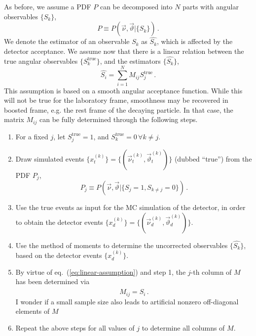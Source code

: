 \documentclass[aps,prd,reprint,nofootinbib,preprintnumbers]{revtex4}
\newcommand{\refeq}[1]{eq.~(\ref{eq:#1})}
\renewcommand{\theta}{\vartheta}
\newcommand{\est}[1]{\widehat{#1}}
\newcommand{\fred}[1]{{\color{brown!85!black}#1}}
\begin{document}
As before, we assume a PDF $P$ can be decomposed into $N$ parts with angular observables $\lbrace S_k\rbrace$,
\begin{equation}
    P \equiv P(\vec\nu,\vec\theta | \lbrace S_k \rbrace)\,.
\end{equation}
We denote the estimator of an
observable $S_k$ as $\est{S_k}$, which is affected by the detector acceptance. We assume now that there is a linear relation
between the true angular observables $\lbrace S_k^\text{true}\rbrace$, and the estimators $\lbrace \est{S_k}\rbrace$,
\begin{equation}
    \label{eq:linear-assumption}
    \est{S_i} = \sum_{i = 1}^N M_{i j} S_j^\text{true}\,.
\end{equation}
This assumption is based on a smooth angular acceptance function. While this will not be true for the laboratory frame,
smoothness may be recovered in boosted frame, e.g. the rest frame of the decaying particle.
In that case, the matrix $M_{ij}$ can be fully determined through the following steps.
\begin{enumerate}
    \item For a fixed $j$, let $S_j^\text{true} = 1$, and $S_k^\text{true} = 0\,\forall k\neq j$.
    \item Draw simulated events $\lbrace x_t^{(k)}\rbrace = \lbrace(\vec{\nu}^{(k)}_t,\vec\theta^{(k)}_t)\rbrace$ (dubbed ``true'') from the PDF $P_j$,
        \begin{equation}
            P_j \equiv P(\vec\nu,\vec\theta | \lbrace S_j = 1, S_{k\neq j} = 0\rbrace)\,.
        \end{equation}
    \item Use the true events as input for the MC simulation of the detector, in order to obtain the detector
        events $\lbrace x^{(k)}_d\rbrace = \lbrace(\vec{\nu}^{(k)}_d,\vec\theta^{(k)}_d)\rbrace$.
    \item Use the method of moments to determine the uncorrected observables $\lbrace \est{S_k} \rbrace$, based on the detector
        events $\lbrace x^{(k)}_d\rbrace$.
    \item By virtue of \refeq{linear-assumption} and step 1, the $j$-th column of $M$ has been determined via
        \begin{equation}
            M_{ij} = \est{S_i}\,.
        \end{equation}
        \fred{I wonder if a small sample size also leads to artificial
          nonzero off-diagonal elements of $M$}
    \item Repeat the above steps for all values of $j$ to determine all columns of $M$.
\end{enumerate}
\end{document}
